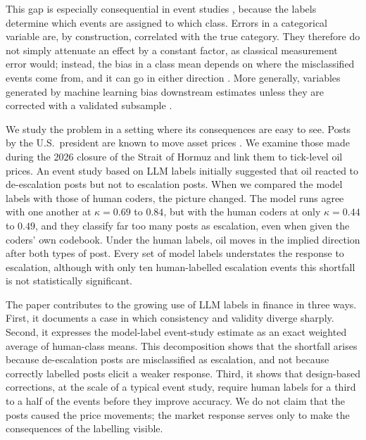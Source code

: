 \documentclass[12pt]{article}
\begin{document}
This gap is especially consequential in event studies \citep{mackinlay1997}, because the labels determine which events are assigned to which class. Errors in a categorical variable are, by construction, correlated with the true category. They therefore do not simply attenuate an effect by a constant factor, as classical measurement error would; instead, the bias in a class mean depends on where the misclassified events come from, and it can go in either direction \citep{aigner1973, bound2001, mahajan2006, lewbel2007}. More generally, variables generated by machine learning bias downstream estimates unless they are corrected with a validated subsample \citep{yang2018, angelopoulos2023, egami2023}.

We study the problem in a setting where its consequences are easy to see. Posts by the U.S.\ president are known to move asset prices \citep{born2017, ge2019}. We examine those made during the 2026 closure of the Strait of Hormuz and link them to tick-level oil prices. An event study based on LLM labels initially suggested that oil reacted to de-escalation posts but not to escalation posts. When we compared the model labels with those of human coders, the picture changed. The model runs agree with one another at $\kappa = 0.69$ to $0.84$, but with the human coders at only $\kappa = 0.44$ to $0.49$, and they classify far too many posts as escalation, even when given the coders' own codebook. Under the human labels, oil moves in the implied direction after both types of post. Every set of model labels understates the response to escalation, although with only ten human-labelled escalation events this shortfall is not statistically significant.

The paper contributes to the growing use of LLM labels in finance in three ways. First, it documents a case in which consistency and validity diverge sharply. Second, it expresses the model-label event-study estimate as an exact weighted average of human-class means. This decomposition shows that the shortfall arises because de-escalation posts are misclassified as escalation, and not because correctly labelled posts elicit a weaker response. Third, it shows that design-based corrections, at the scale of a typical event study, require human labels for a third to a half of the events before they improve accuracy. We do not claim that the posts caused the price movements; the market response serves only to make the consequences of the labelling visible.

\end{document}
